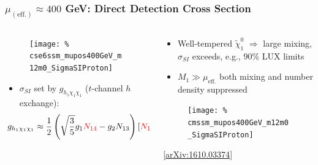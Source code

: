 \documentclass[10pt,aspectratio=169]{beamer}
\begin{document}
\begin{frame}
  \frametitle{$\mu_{(\text{eff.})} \approx 400$ GeV: Direct Detection
    Cross Section}
  \begin{columns}[t]
    \begin{column}{0.6\textwidth}
      \vspace{-12pt}
      \begin{figure}
        \texttt{[image: \%
          cse6ssm\_mupos400GeV\_m12m0\_SigmaSIProton]}
      \end{figure}
      \vspace*{-8pt}
      \begin{itemize}
      \item $\sigma_{SI}$ set by $g_{h_1 \chi_1 \chi_1}$ ($t$-channel $h$
        exchange):
        {
          \begin{equation*}\hspace*{-15pt}
            g_{h_1 \chi_1 \chi_1} \approx \frac{1}{2} \left (
            \sqrt{\frac{3}{5}} g_1
                 {\color{red} N_{14}}
                 - g_2 N_{13} \right ) \left [ {\color{red}N_{11}}
                   (U_h)_{11} - {\color{red}N_{12}} (U_h)_{12}
                   \right ]
        \end{equation*}}
      \end{itemize}
    \end{column}
    \begin{column}{0.5\textwidth}
      \vspace{-10pt}
      \begin{itemize}
        \item Well-tempered $\tilde{\chi}^0_1$ $\Rightarrow$ large
          mixing, {\color{red}$\sigma_{SI}$ exceeds, e.g., $90$\% LUX
            limits}
        \item $M_1 \gg \mu_{\text{eff.}}$ both mixing and number density
          suppressed
      \end{itemize}
      \vspace{-8pt}
      \begin{figure}
        \texttt{[image: \%
          cmssm\_mupos400GeV\_m12m0\_SigmaSIProton]}
      \end{figure}
      \vspace{-20pt}
      \begin{center}
        \tiny [\href{https://arxiv.org/abs/1610.03374}{arXiv:1610.03374}]
      \end{center}      
    \end{column}
  \end{columns}
\end{frame}
\end{document}
